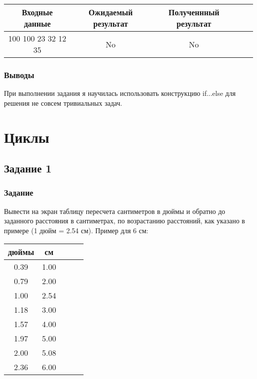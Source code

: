 \documentclass[12pt,a4paper]{report}
\begin{document}
 \begin{tabular}{|c|c|c|c|c|}
	\hline 	
	Входные данные & Ожидаемый результат & Полученнный результат \\
	\hline
	100 100 23 32 12 35 & No & No \\
	\hline
 \end{tabular}

\subsection{Выводы}
При выполнении задания я научилась использовать конструкцию if...else для решения не совсем тривиальных задач.

%


%



\chapter{Циклы}
\section{Задание 1}
\subsection{Задание}
Вывести на экран таблицу пересчета сантиметров в дюймы и обратно до заданного расстояния в сантиметрах, по возрастанию расстояний, как указано в примере (1 дюйм = 2.54 см). Пример для 6 см:
	
 \begin{tabular}{|c|c|c|c|c|}
	\hline 
 	дюймы  &  см \\
	\hline   
 	0.39 &  1.00 \\
 	\hline   
 	0.79 &  2.00 \\
 	\hline   
 	1.00 &  2.54 \\
 	\hline   
 	1.18 &  3.00 \\
 	\hline   
 	1.57 &  4.00 \\
 	\hline   
 	1.97 &  5.00 \\
 	\hline   
 	2.00 &  5.08 \\
 	\hline   
 	2.36 &  6.00\\
	\hline
 \end{tabular}	
	
\end{document}
